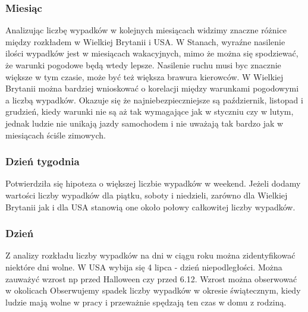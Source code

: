 \subsubsection{Miesiąc}\label{miesiac}

Analizując liczbę wypadków w kolejnych miesiącach widzimy znaczne
różnice między rozkładem w Wielkiej Brytanii i USA. W Stanach, wyraźne
nasilenie ilości wypadków jest w miesiącach wakacyjnych, mimo że można
się spodziewać, że warunki pogodowe będą wtedy lepsze. Nasilenie ruchu
musi byc znacznie większe w tym czasie, może być też większa brawura
kierowców. W Wielkiej Brytanii można bardziej wnioskować o korelacji
między warunkami pogodowymi a liczbą wypadków. Okazuje się że
najniebezpieczniejsze są październik, listopad i grudzień, kiedy warunki
nie są aż tak wymagające jak w styczniu czy w lutym, jednak ludzie nie
unikają jazdy samochodem i nie uważają tak bardzo jak w miesiącach
ściśle zimowych.

\subsubsection{Dzień tygodnia}\label{dzien-tygodnia}

Potwierdziła się hipoteza o większej liczbie wypadków w weekend. Jeżeli
dodamy wartości liczby wypadków dla piątku, soboty i niedzieli, zarówno
dla Wielkiej Brytanii jak i dla USA stanowią one około połowy całkowitej
liczby wypadków.

\subsubsection{Dzień}\label{dzien}

Z analizy rozkładu liczby wypadków na dni w ciągu roku można
zidentyfikować niektóre dni wolne. W USA wybija się 4 lipca - dzień
niepodległości. Można zauważyć wzrost np przed Halloween czy przed 6.12.
Wzrost można obserwować w okolicach Obserwujemy spadek liczby wypadków w
okresie świątecznym, kiedy ludzie mają wolne w pracy i przeważnie
spędzają ten czas w domu z rodziną.

